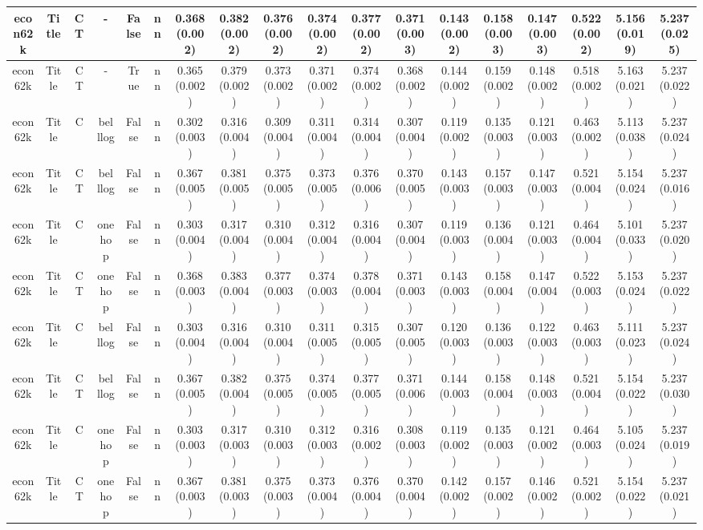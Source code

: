 \documentclass{article}
\begin{document}
{\begin{landscape}
\begin{table}[!h]
{\begin{tabular}{@{}cccccccccccccccccc@{}}
\midrule econ62k & Title & CT & - & False & nn & 0.368 (0.002) & 0.382 (0.002) & 0.376 (0.002) & 0.374 (0.002) & 0.377 (0.002) & 0.371 (0.003) & 0.143 (0.002) & 0.158 (0.003) & 0.147 (0.003) &0.522 (0.002) & 5.156 (0.019) & 5.237 (0.025)\\
\midrule econ62k & Title & CT & - & True & nn & 0.365 (0.002) & 0.379 (0.002) & 0.373 (0.002) & 0.371 (0.002) & 0.374 (0.002) & 0.368 (0.002) & 0.144 (0.002) & 0.159 (0.002) & 0.148 (0.002) &0.518 (0.002) & 5.163 (0.021) & 5.237 (0.022)\\
\midrule econ62k & Title & C & belllog & False & nn & 0.302 (0.003) & 0.316 (0.004) & 0.309 (0.004) & 0.311 (0.004) & 0.314 (0.004) & 0.307 (0.004) & 0.119 (0.002) & 0.135 (0.003) & 0.121 (0.003) &0.463 (0.002) & 5.113 (0.038) & 5.237 (0.024)\\
\midrule econ62k & Title & CT & belllog & False & nn & 0.367 (0.005) & 0.381 (0.005) & 0.375 (0.005) & 0.373 (0.005) & 0.376 (0.006) & 0.370 (0.005) & 0.143 (0.003) & 0.157 (0.003) & 0.147 (0.003) &0.521 (0.004) & 5.154 (0.024) & 5.237 (0.016)\\
\midrule econ62k & Title & C & onehop & False & nn & 0.303 (0.004) & 0.317 (0.004) & 0.310 (0.004) & 0.312 (0.004) & 0.316 (0.004) & 0.307 (0.004) & 0.119 (0.003) & 0.136 (0.004) & 0.121 (0.003) &0.464 (0.004) & 5.101 (0.033) & 5.237 (0.020)\\
\midrule econ62k & Title & CT & onehop & False & nn & 0.368 (0.003) & 0.383 (0.004) & 0.377 (0.003) & 0.374 (0.003) & 0.378 (0.004) & 0.371 (0.003) & 0.143 (0.003) & 0.158 (0.004) & 0.147 (0.004) &0.522 (0.003) & 5.153 (0.024) & 5.237 (0.022)\\
\midrule econ62k & Title & C & belllog & False & nn & 0.303 (0.004) & 0.316 (0.004) & 0.310 (0.004) & 0.311 (0.005) & 0.315 (0.005) & 0.307 (0.005) & 0.120 (0.003) & 0.136 (0.003) & 0.122 (0.003) &0.463 (0.003) & 5.111 (0.023) & 5.237 (0.024)\\
\midrule econ62k & Title & CT & belllog & False & nn & 0.367 (0.005) & 0.382 (0.004) & 0.375 (0.005) & 0.374 (0.005) & 0.377 (0.005) & 0.371 (0.006) & 0.144 (0.003) & 0.158 (0.004) & 0.148 (0.003) &0.521 (0.004) & 5.154 (0.022) & 5.237 (0.030)\\
\midrule econ62k & Title & C & onehop & False & nn & 0.303 (0.003) & 0.317 (0.003) & 0.310 (0.003) & 0.312 (0.003) & 0.316 (0.002) & 0.308 (0.003) & 0.119 (0.002) & 0.135 (0.003) & 0.121 (0.002) &0.464 (0.003) & 5.105 (0.024) & 5.237 (0.019)\\
\midrule econ62k & Title & CT & onehop & False & nn & 0.367 (0.003) & 0.381 (0.003) & 0.375 (0.003) & 0.373 (0.004) & 0.376 (0.004) & 0.370 (0.004) & 0.142 (0.002) & 0.157 (0.002) & 0.146 (0.002) &0.521 (0.002) & 5.154 (0.022) & 5.237 (0.021)\\

\end{tabular}}
\end{table}
\end{landscape}}
\end{document}
